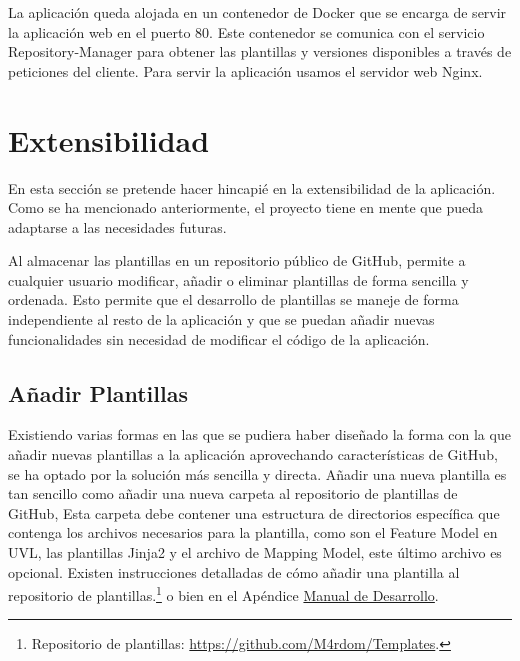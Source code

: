 \documentclass[12pt, a4paper, twoside]{article}
\begin{document}
La aplicación queda alojada en un contenedor de Docker que se encarga de servir la aplicación web en el puerto 80. Este contenedor se comunica con el servicio Repository-Manager para obtener las plantillas y versiones disponibles a través de peticiones del cliente.
Para servir la aplicación usamos el servidor web Nginx.













\section{Extensibilidad}
\label{sec:Extensibilidad}
En esta sección se pretende hacer hincapié en la extensibilidad de la aplicación.
Como se ha mencionado anteriormente, el proyecto tiene en mente que pueda adaptarse a las necesidades futuras.

Al almacenar las plantillas en un repositorio público de GitHub, permite a cualquier usuario modificar, añadir o eliminar plantillas de forma sencilla y ordenada.
Esto permite que el desarrollo de plantillas se maneje de forma independiente al resto de la aplicación y que se puedan añadir nuevas funcionalidades sin necesidad de modificar el código de la aplicación.
\subsection{Añadir Plantillas}
Existiendo varias formas en las que se pudiera haber diseñado la forma con la que añadir nuevas plantillas a la aplicación aprovechando características de GitHub, se ha optado por la solución más sencilla y directa.
Añadir una nueva plantilla es tan sencillo como añadir una nueva carpeta al repositorio de plantillas de GitHub,
Esta carpeta debe contener una estructura de directorios específica que contenga los archivos necesarios para la plantilla, como son el Feature Model en UVL, las plantillas Jinja2 y el archivo de Mapping Model, este último archivo es opcional.
Existen instrucciones detalladas de cómo añadir una plantilla al repositorio de plantillas.\footnote{Repositorio de plantillas: \url{https://github.com/M4rdom/Templates}.} o bien en el Apéndice \hyperref[sec:Manual de Desarrollo]{Manual de Desarrollo}.

\newpage
\end{document}
